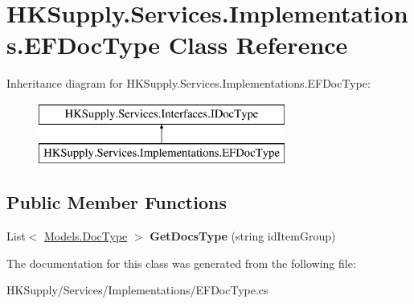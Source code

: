 \hypertarget{class_h_k_supply_1_1_services_1_1_implementations_1_1_e_f_doc_type}{}\section{H\+K\+Supply.\+Services.\+Implementations.\+E\+F\+Doc\+Type Class Reference}
\label{class_h_k_supply_1_1_services_1_1_implementations_1_1_e_f_doc_type}
Inheritance diagram for H\+K\+Supply.\+Services.\+Implementations.\+E\+F\+Doc\+Type\+:\begin{figure}[H]
\begin{center}
\leavevmode
\includegraphics[height=2.000000cm]{class_h_k_supply_1_1_services_1_1_implementations_1_1_e_f_doc_type}
\end{center}
\end{figure}
\subsection*{Public Member Functions}
\begin{DoxyCompactItemize}
\item 
\mbox{\label{class_h_k_supply_1_1_services_1_1_implementations_1_1_e_f_doc_type_a83b9c517bfc1f39bd3d3ca8089418a06}} 
List$<$ \mbox{\hyperlink{class_h_k_supply_1_1_models_1_1_doc_type}{Models.\+Doc\+Type}} $>$ {\bfseries Get\+Docs\+Type} (string id\+Item\+Group)
\end{DoxyCompactItemize}


The documentation for this class was generated from the following file\+:\begin{DoxyCompactItemize}
\item 
H\+K\+Supply/\+Services/\+Implementations/E\+F\+Doc\+Type.\+cs\end{DoxyCompactItemize}
